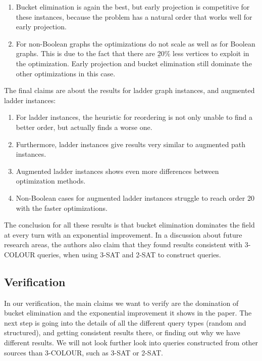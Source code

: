 \begin{enumerate}[resume]
	\item \label{claim:AugBucketDom} Bucket elimination is again the best, but early projection is competitive for these instances, because the problem has a natural order that works well for early projection.
	\item \label{claim:AugNonBool} For non-Boolean graphs the optimizations do not scale as well as for Boolean graphs. This is due to the fact that there are {\b 20\% less vertices to exploit in the optimization}. Early projection and bucket elimination still dominate the other optimizations in this case.
\end{enumerate}

\noindent The final claims are about the results for ladder graph instances, and augmented ladder instances:
\begin{enumerate}[resume]
	\item \label{claim:AugLadReordering} For ladder instances, the heuristic for reordering is not only unable to find a better order, but actually finds a worse one.
	\item \label{claim:AugLadSimilar} Furthermore, ladder instances give results very similar to augmented path instances.
	\item \label{claim:AugLadMoreDiff} Augmented ladder instances shows even more differences between optimization methods.
	\item \label{claim:AugLadNonBool} Non-Boolean cases for augmented ladder instances struggle to reach order 20 with the faster optimizations.
\end{enumerate}

\noindent The conclusion for all these results is that bucket elimination dominates the field at every turn with an exponential improvement. In a discussion about future research areas, the authors also claim that they found results consistent with 3-COLOUR queries, when using 3-SAT and 2-SAT to construct queries.

\subsection{Verification}
In our verification, the main claims we want to verify are the domination of bucket elimination and the exponential improvement it shows in the paper. The next step is going into the details of all the different query types (random and structured), and getting consistent results there, or finding out why we have different results. We will not look further look into queries constructed from other sources than 3-COLOUR, such as 3-SAT or 2-SAT.